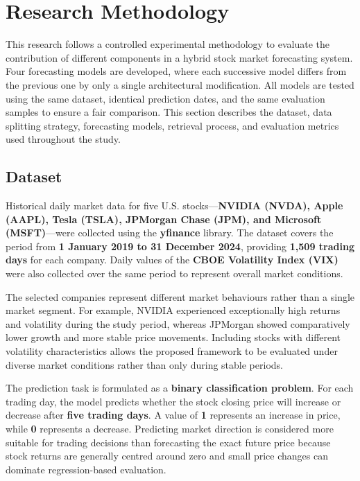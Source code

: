 \section{Research Methodology}\label{sec:methodology}

This research follows a controlled experimental methodology to evaluate
the contribution of different components in a hybrid stock market
forecasting system. Four forecasting models are developed, where each
successive model differs from the previous one by only a single
architectural modification. All models are tested using the same
dataset, identical prediction dates, and the same evaluation samples to
ensure a fair comparison. This section describes the dataset, data
splitting strategy, forecasting models, retrieval process, and
evaluation metrics used throughout the study.

\subsection{Dataset}\label{sec:dataset}

Historical daily market data for five U.S. stocks---\textbf{NVIDIA
(NVDA), Apple (AAPL), Tesla (TSLA), JPMorgan Chase (JPM), and Microsoft
(MSFT)}---were collected using the \textbf{yfinance} library. The
dataset covers the period from \textbf{1 January 2019 to 31 December
2024}, providing \textbf{1,509 trading days} for each company. Daily
values of the \textbf{CBOE Volatility Index (VIX)} were also collected
over the same period to represent overall market conditions.

The selected companies represent different market behaviours rather than
a single market segment. For example, NVIDIA experienced exceptionally
high returns and volatility during the study period, whereas JPMorgan
showed comparatively lower growth and more stable price movements.
Including stocks with different volatility characteristics allows the
proposed framework to be evaluated under diverse market conditions
rather than only during stable periods.

The prediction task is formulated as a \textbf{binary classification
problem}. For each trading day, the model predicts whether the stock
closing price will increase or decrease after \textbf{five trading
days}. A value of \textbf{1} represents an increase in price, while
\textbf{0} represents a decrease. Predicting market direction is
considered more suitable for trading decisions than forecasting the
exact future price because stock returns are generally centred around
zero and small price changes can dominate regression-based evaluation.


